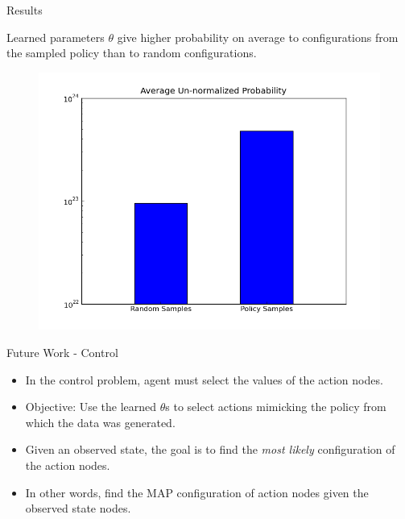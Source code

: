 \documentclass{beamer}
\begin{document}
\begin{frame}{Results}

Learned parameters $\theta$ give higher probability on average to configurations from the sampled policy than to random configurations.

\begin{figure}[htp]
  \centering
  \includegraphics[width=.8\textwidth]{graph.png}
\end{figure}



\end{frame}




\begin{frame}{Future Work - Control}
\begin{itemize}
\item In the control problem, agent must select the values of the action nodes. 
\item Objective: Use the learned $\theta$s to select actions mimicking the policy from which the data was generated.
\item Given an observed state, the goal is to find the \textit{most likely} configuration of the action nodes.
\item In other words, find the MAP configuration of action nodes given the observed state nodes.
\end{itemize}
\end{frame}
\end{document}
